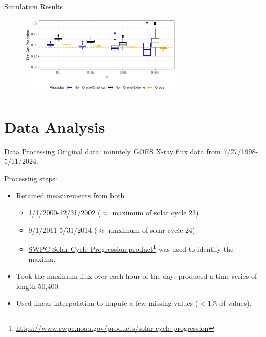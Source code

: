 \documentclass{beamer}
\begin{document}
\begin{frame}{Simulation Results}
    \begin{figure}[!htb]
    \centering
    \includegraphics[width=0.7\textwidth]{figures/quantile_type_impact.pdf}
    \label{fig:quantile_type_impact}
    \end{figure}
\end{frame}

\section{Data Analysis}

\begin{frame}{Data Processing}
    Original data: minutely GOES X-ray flux data from 7/27/1998-5/11/2024.

    Processing steps:
    \begin{itemize}
        \item Retained measurements from both
        \begin{itemize}
            \item 1/1/2000-12/31/2002 ($\approx$ maximum of solar cycle 23)
            \item 9/1/2011-5/31/2014 ($\approx$ maximum of solar cycle 24)
            \item \href{https://www.swpc.noaa.gov/products/solar-cycle-progression}{SWPC Solar Cycle Progression product}\footnote{\url{https://www.swpc.noaa.gov/products/solar-cycle-progression}} was used to identify the maxima.
        \end{itemize}
        \item Took the maximum flux over each hour of the day; produced a time series of length 50,400.
        \item Used linear interpolation to impute a few missing values ($< 1\%$ of values).
    \end{itemize}
\end{frame}
\end{document}

